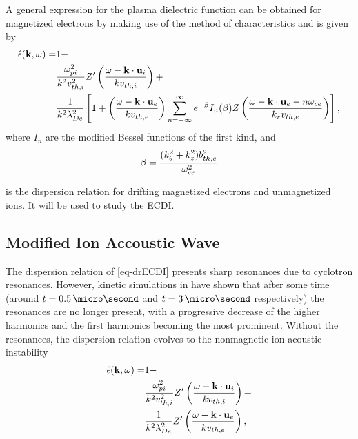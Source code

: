     \vspace{1em}
    A general expression for the plasma dielectric function can be obtained for magnetized electrons by making use of the method of characteristics and is given by
    \begin{equation} \label{eq-drECDI}
      \begin{split}
      \hat\epsilon({\mathbf k},\omega) =& 1 - \\
       &\frac{\omega_{pi}^2}{k^2 v^2_{th, i}} Z'\left( \frac{\omega - {\mathbf k} \cdot {\mathbf u_{i}}}{k v_{th, i}}  \right) + \\
       & \frac{1}{k^2 \lambda_{De}^2} \left[ 1 + \left(  \frac{\omega - {\mathbf k} \cdot {\mathbf u_{e}}}{k v_{th, e}} \right) \sum_{n=-\infty}^{\infty} e^{- \beta} I_n(\beta) Z\left(  \frac{\omega - {\mathbf k} \cdot {\mathbf u_{e} - n \ensuremath{\omega_{ce}}}}{k_{r} v_{th, e}} \right)  \right],
    \end{split}
    \end{equation}
    where $I_n$ are the modified Bessel functions of the first kind, and 
    \begin{equation} \label{eq-beta}
      \beta = \frac{(k_{\theta}^2 + k_z^2) b^2_{th, e}}{ \omega_{ce}^2}
    \end{equation}
    
     is the dispersion relation for drifting magnetized electrons and unmagnetized ions.
    It will be used to study the \acf{ECDI}.
    


  \subsection{Modified Ion Accoustic Wave}
    \label{sucsec-IAW}
    
    The dispersion relation of \cref{eq-drECDI} presents sharp resonances due to cyclotron resonances.
    However, kinetic simulations in \citet{janhunen2018,taccogna2019} have shown that after some time (around  $t=0.5\,\micro\second$ and $t=3\,\micro\second$ respectively) the resonances are no longer present, with a progressive decrease of the higher harmonics and the first harmonics becoming the most prominent.
    Without the resonances, the dispersion relation evolves to the nonmagnetic ion-acoustic instability
    \begin{equation} \label{eq-drIAWgene}
      \begin{split}
      \hat\epsilon({\mathbf k},\omega) =& 1 - \\
       &\frac{\omega_{pi}^2}{k^2 v^2_{th, i}} Z'\left( \frac{\omega - {\mathbf k} \cdot {\mathbf u_{i}}}{k v_{th, i}}  \right) + \\
       & \frac{1}{k^2 \lambda_{De}^2}  Z'\left(  \frac{\omega - {\mathbf k} \cdot {\mathbf u_{e}}}{k v_{th, e}} \right) ,
    \end{split}
    \end{equation}

